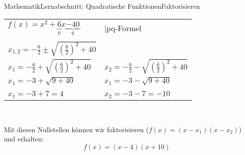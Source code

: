 \documentclass[11pt,twocolumn,oneside,openany,headings=optiontotoc,11pt,numbers=noenddot]{article}
\begin{document}
\begin{worksheet}{Mathematik}{Lernabschnitt: Quadratische Funktionen}{Faktorisieren}
		\par\noindent
		\begin{tabularx}{0.5\textwidth}{Xl}
			\(f(x) = x^2 + \underbrace{6}_{p}x \underbrace{- 40}_{q}\) &  |pq-Formel\\
			\\
			\(x_{1,2} = -\frac{6}{2} \pm \sqrt{\left(\frac{6}{2}\right)^2 +40}\)\\
			\(x_1 = -\frac{6}{2} + \sqrt{\left(\frac{6}{2}\right)^2 +40}\) & \(x_2 = -\frac{6}{2} - \sqrt{\left(\frac{6}{2}\right)^2 +40}\)\\
			\(x_1 = - 3 + \sqrt{9 + 40}\) & \(x_1 = - 3 - \sqrt{9 + 40}\)\\
			\\
			\colorbox{green!10}{\(x_1 = -3 + 7 = 4\)} & \colorbox{green!10}{\(x_2 = -3 - 7 = -10\)}
		\end{tabularx}\\
		\par\noindent
		Mit diesen Nullstellen können wir faktorisieren (\(f(x) = (x-x_1)(x-x_2)\)) und erhalten:
		\[f(x) = (x-4)(x+10)\]
	\end{worksheet}
\end{document}
